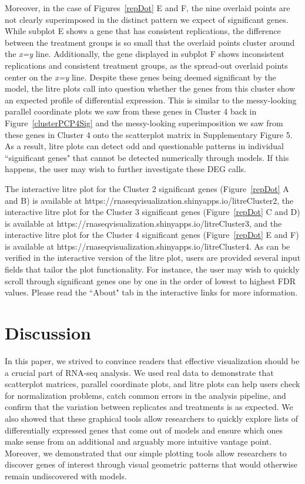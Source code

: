 \documentclass{bioinfo}
\begin{document}
Moreover, in the case of Figures~\ref{repDot} E and F, the nine overlaid points are not clearly superimposed in the distinct pattern we expect of significant genes. While subplot E shows a gene that has consistent replications, the difference between the treatment groups is so small that the overlaid points cluster around the \textit{x=y} line. Additionally, the gene displayed in subplot F shows inconsistent replications and consistent treatment groups, as the spread-out overlaid points center on the \textit{x=y} line. Despite these genes being deemed significant by the model, the litre plots call into question whether the genes from this cluster show an expected profile of differential expression. This is similar to the messy-looking parallel coordinate plots we saw from these genes in Cluster 4 back in Figure~\ref{clusterPCP4Sig} and the messy-looking superimposition we saw from these genes in Cluster 4 onto the scatterplot matrix in Supplementary Figure 5. As a result, litre plots can detect odd and questionable patterns in individual ``significant genes" that cannot be detected numerically through models. If this happens, the user may wish to further investigate these DEG calls.

The interactive litre plot for the Cluster 2 significant genes (Figure~\ref{repDot} A and B) is available at https://rnaseqvisualization.shinyapps.io/litreCluster2, the interactive litre plot for the Cluster 3 significant genes (Figure~\ref{repDot} C and D) is available at https://rnaseqvisualization.shinyapps.io/litreCluster3, and the interactive litre plot for the Cluster 4 significant genes (Figure~\ref{repDot} E and F) is available at https://rnaseqvisualization.shinyapps.io/litreCluster4. As can be verified in the interactive version of the litre plot, users are provided several input fields that tailor the plot functionality. For instance, the user may wish to quickly scroll through significant genes one by one in the order of lowest to highest FDR values. Please read the ``About" tab in the interactive links for more information.

\section{Discussion}

In this paper, we strived to convince readers that effective visualization should be a crucial part of RNA-seq analysis. We used real data to demonstrate that scatterplot matrices, parallel coordinate plots, and litre plots can help users check for normalization problems, catch common errors in the analysis pipeline, and confirm that the variation between replicates and treatments is as expected. We also showed that these graphical tools allow researchers to quickly explore lists of differentially expressed genes that come out of models and ensure which ones make sense from an additional and arguably more intuitive vantage point. Moreover, we demonstrated that our simple plotting tools allow researchers to discover genes of interest through visual geometric patterns that would otherwise remain undiscovered with models.
\end{document}
